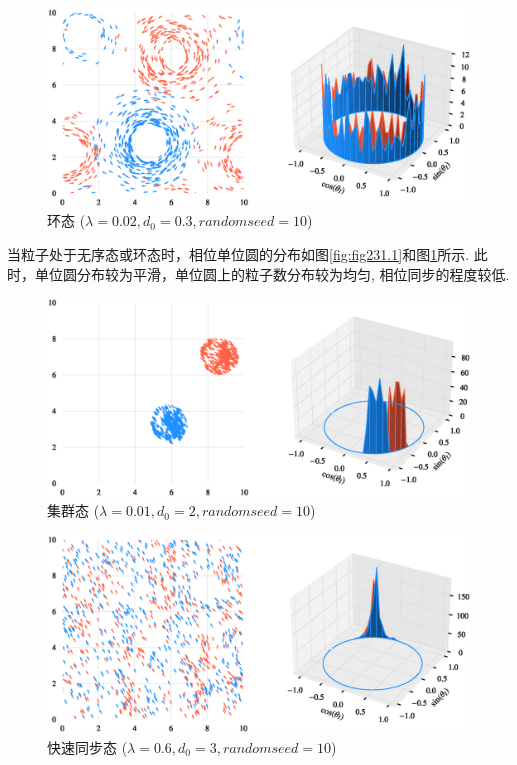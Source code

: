 \documentclass{article}
\begin{document}
\begin{figure}[H]
	\centering
	\includegraphics[width=\textwidth]{./figs/CorrectCoupling_uniform_0.020_0.30.eps}
	\vspace{-1cm}
	\caption{环态 ($\lambda=0.02, d_0=0.3, random seed=10$)}
	\label{fig:fig231.2}
\end{figure}

当粒子处于无序态或环态时，相位单位圆的分布如图\ref{fig:fig231.1}和图\ref{fig:fig231.2}所示. 此时，单位圆分布较为平滑，单位圆上的粒子数分布较为均匀, 相位同步的程度较低.

\begin{figure}[H]
	\centering
	\includegraphics[width=\textwidth]{./figs/CorrectCoupling_uniform_0.010_2.00.eps}
	\vspace{-1cm}
	\caption{集群态 ($\lambda=0.01, d_0=2, random seed=10$)}
	\label{fig:fig231.3}
\end{figure}

\begin{figure}[H]
	\centering
	\includegraphics[width=\textwidth]{./figs/CorrectCoupling_uniform_0.600_3.00.eps}
	\vspace{-1cm}
	\caption{快速同步态 ($\lambda=0.6, d_0=3, random seed=10$)}
	\label{fig:fig231.4}
\end{figure}
\end{document}
